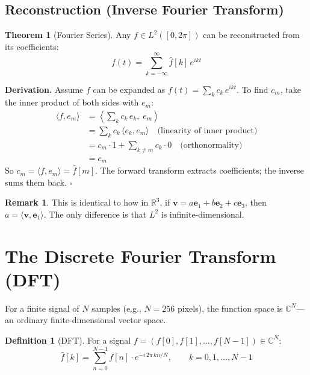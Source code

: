 \documentclass[11pt,a4paper]{article}
\theoremstyle{definition}
\newtheorem{definition}{Definition}[section]
\newtheorem{theorem}{Theorem}[section]
\newtheorem{remark}{Remark}[section]
\begin{document}
\subsection{Reconstruction (Inverse Fourier Transform)}

\begin{theorem}[Fourier Series]
Any $f \in L^2([0, 2\pi])$ can be reconstructed from its coefficients:
\begin{equation}
    f(t) = \sum_{k=-\infty}^{\infty} \hat{f}[k] \, e^{ikt}
\end{equation}
\end{theorem}

\textbf{Derivation.} Assume $f$ can be expanded as $f(t) = \sum_k c_k \, e^{ikt}$. To find $c_m$, take the inner product of both sides with $e_m$:
\begin{align}
    \langle f, e_m \rangle &= \left\langle \sum_k c_k \, e_k, \; e_m \right\rangle \\
    &= \sum_k c_k \, \langle e_k, e_m \rangle \quad\text{(linearity of inner product)} \\
    &= c_m \cdot 1 + \sum_{k \neq m} c_k \cdot 0 \quad\text{(orthonormality)} \\
    &= c_m
\end{align}
So $c_m = \langle f, e_m \rangle = \hat{f}[m]$. The forward transform extracts coefficients; the inverse sums them back. $\square$

\begin{remark}
This is identical to how in $\mathbb{R}^3$, if $\mathbf{v} = a\mathbf{e}_1 + b\mathbf{e}_2 + c\mathbf{e}_3$, then $a = \langle \mathbf{v}, \mathbf{e}_1 \rangle$. The only difference is that $L^2$ is infinite-dimensional.
\end{remark}

\section{The Discrete Fourier Transform (DFT)}

For a finite signal of $N$ samples (e.g., $N = 256$ pixels), the function space is $\mathbb{C}^N$---an ordinary finite-dimensional vector space.

\begin{definition}[DFT]
For a signal $f = (f[0], f[1], \ldots, f[N-1]) \in \mathbb{C}^N$:
\begin{equation}
    \hat{f}[k] = \sum_{n=0}^{N-1} f[n] \cdot e^{-i \, 2\pi \, kn / N}, \qquad k = 0, 1, \ldots, N-1
\end{equation}
\end{definition}
\end{document}
